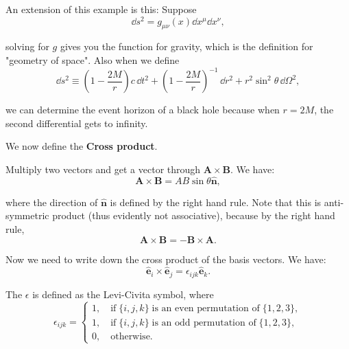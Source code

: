 \documentclass[10pt]{article}
\begin{document}
	An extension of this example is this: Suppose
	\begin{equation}
	  \dd s^{2} = g_{\mu \nu} (x) \dd x^{\mu} \dd x^{\nu},
	\end{equation}

	solving for $g$ gives you the function for gravity, which is the definition for "geometry of space". Also when we define
	\begin{equation}\label{eq0424}
	  \dd s^{2} \equiv \left( 1-\frac{2M}{r} \right) c\,\dd t^{2} + \left( 1-\frac{2M}{r} \right)^{-1}\,\dd r^{2} + r^{2}\sin ^{2}\theta \,\dd\Omega^{2},
	\end{equation}

	we can determine the event horizon of a black hole because when $r=2M$, the second differential gets to infinity.

	\vspace{1\baselineskip}
	We now define the \textbf{Cross product}. 
	\begin{definition}
		Multiply two vectors and get a vector through $\mathbf{A} \times \mathbf{B}$. We have:
		\begin{equation}
		  \mathbf{A} \times \mathbf{B} = AB\sin \theta \hat{\mathbf{n}},
		\end{equation}

		where the direction of $\hat{\mathbf{n}}$ is defined by the right hand rule. Note that this is anti-symmetric product (thus evidently not associative), because by the right hand rule,
		\begin{equation}
		  \mathbf{A} \times \mathbf{B} = -\mathbf{B} \times \mathbf{A}.
		\end{equation}
	\end{definition}

	Now we need to write down the cross product of the basis vectors. We have:
	\begin{equation}
	  \hat{\mathbf{e}}_{i} \times \hat{\mathbf{e}}_{j} = \epsilon_{ijk} \hat{\mathbf{e}}_{k}.
	\end{equation}

	The $\epsilon$ is defined as the Levi-Civita symbol, where
	\begin{equation}
	  \epsilon_{ijk} = \begin{cases} 1, \quad \text{if} \; \{i,j,k\} \; \text{is an even permutation of} \; \{1,2,3\}, \\ 1, \quad \text{if} \; \{i,j,k\} \; \text{is an odd permutation of} \; \{1,2,3\}, \\ 0, \quad \text{otherwise.}  \end{cases}
	\end{equation}
\end{document}
